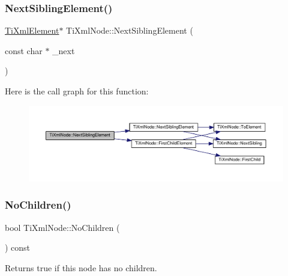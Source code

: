 \subsubsection{\texorpdfstring{Next\+Sibling\+Element()}{NextSiblingElement()}\hspace{0.1cm}{\footnotesize\ttfamily [4/4]}}
{\footnotesize\ttfamily \hyperlink{class_ti_xml_element}{Ti\+Xml\+Element}$\ast$ Ti\+Xml\+Node\+::\+Next\+Sibling\+Element (\begin{DoxyParamCaption}\item[{const char $\ast$}]{\+\_\+next }\end{DoxyParamCaption})\hspace{0.3cm}{\ttfamily [inline]}}

Here is the call graph for this function\+:\nopagebreak
\begin{figure}[H]
\begin{center}
\leavevmode
\includegraphics[width=350pt]{class_ti_xml_node_a6e1ac6b800e18049bc75e9f8e63a8e5f_cgraph}
\end{center}
\end{figure}
\mbox{\label{class_ti_xml_node_abe85e0ec04ea59c033f324c8504653e5}} 
\subsubsection{\texorpdfstring{No\+Children()}{NoChildren()}}
{\footnotesize\ttfamily bool Ti\+Xml\+Node\+::\+No\+Children (\begin{DoxyParamCaption}{ }\end{DoxyParamCaption}) const\hspace{0.3cm}{\ttfamily [inline]}}



Returns true if this node has no children. 

\mbox{\label{class_ti_xml_node_ab643043132ffd794f8602685d34a982e}} 
